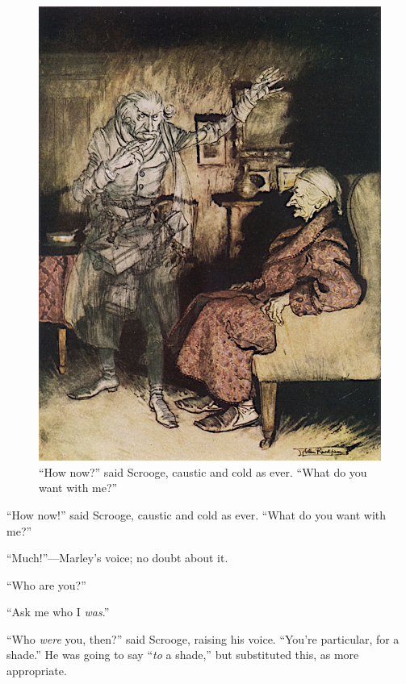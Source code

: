 \documentclass[paper=a5,BCOR=15mm,twoside,DIV=15,headinclude=off,12pt,chapterprefix=off,openany,headings=huge]{scrbook} %
\begin{document}
\begin{figure}[p]
\begin{minipage}[c]{\linewidth}
\includegraphics[width=\linewidth]{scroogemarley2}
\caption*{\enquote{How now?} said Scrooge, caustic and cold as ever. \enquote{What do you want with me?}}
\end{minipage}
\end{figure}

\enquote{How now!} said Scrooge, caustic and cold as ever. \enquote{What do you want with me?}

\enquote{Much!}—Marley's voice; no doubt about it.

\enquote{Who are you?}

\enquote{Ask me who I \textit{was}.}

\enquote{Who \textit{were} you, then?} said Scrooge, raising his voice. \enquote{You're particular, for a shade.} He was going to say \enquote{\textit{to} a shade,} but substituted this, as more appropriate.
\end{document}
